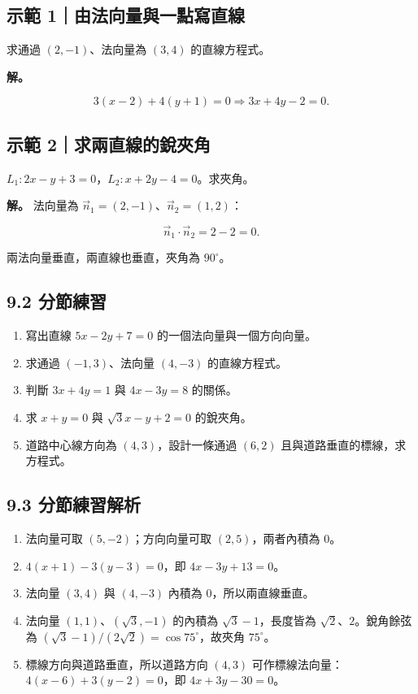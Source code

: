 \documentclass[11pt,a4paper]{article}
\providecommand{\tightlist}{%
  \setlength{\itemsep}{0pt}\setlength{\parskip}{0pt}}
\begin{document}
\subsection{示範 1｜由法向量與一點寫直線}\label{ux793aux7bc4-1ux7531ux6cd5ux5411ux91cfux8207ux4e00ux9edeux5bebux76f4ux7dda}

求通過 \((2,-1)\)、法向量為 \((3,4)\) 的直線方程式。

\textbf{解。}

\[
3(x-2)+4(y+1)=0
\Rightarrow3x+4y-2=0.
\]

\subsection{示範 2｜求兩直線的銳夾角}\label{ux793aux7bc4-2ux6c42ux5169ux76f4ux7ddaux7684ux92b3ux593eux89d2}

\(L_1:2x-y+3=0\)，\(L_2:x+2y-4=0\)。求夾角。

\textbf{解。} 法向量為 \(\vec n_1=(2,-1)\)、\(\vec n_2=(1,2)\)：

\[
\vec n_1\cdot\vec n_2=2-2=0.
\]

兩法向量垂直，兩直線也垂直，夾角為 \(90^\circ\)。

\subsection{9.2 分節練習}\label{ux5206ux7bc0ux7df4ux7fd2-8}

\begin{enumerate}
\def\labelenumi{\arabic{enumi}.}
\tightlist
\item
  寫出直線 \(5x-2y+7=0\) 的一個法向量與一個方向向量。
\item
  求通過 \((-1,3)\)、法向量 \((4,-3)\) 的直線方程式。
\item
  判斷 \(3x+4y=1\) 與 \(4x-3y=8\) 的關係。
\item
  求 \(x+y=0\) 與 \(\sqrt3x-y+2=0\) 的銳夾角。
\item
  道路中心線方向為 \((4,3)\)，設計一條通過 \((6,2)\) 且與道路垂直的標線，求方程式。
\end{enumerate}

\subsection{9.3 分節練習解析}\label{ux5206ux7bc0ux7df4ux7fd2ux89e3ux6790-8}

\begin{enumerate}
\def\labelenumi{\arabic{enumi}.}
\tightlist
\item
  法向量可取 \((5,-2)\)；方向向量可取 \((2,5)\)，兩者內積為 \(0\)。
\item
  \(4(x+1)-3(y-3)=0\)，即 \(4x-3y+13=0\)。
\item
  法向量 \((3,4)\) 與 \((4,-3)\) 內積為 \(0\)，所以兩直線垂直。
\item
  法向量 \((1,1)\)、\((\sqrt3,-1)\) 的內積為 \(\sqrt3-1\)，長度皆為 \(\sqrt2\)、\(2\)。銳角餘弦為 \((\sqrt3-1)/(2\sqrt2)=\cos75^\circ\)，故夾角 \(75^\circ\)。
\item
  標線方向與道路垂直，所以道路方向 \((4,3)\) 可作標線法向量：\(4(x-6)+3(y-2)=0\)，即 \(4x+3y-30=0\)。
\end{enumerate}
\end{document}
